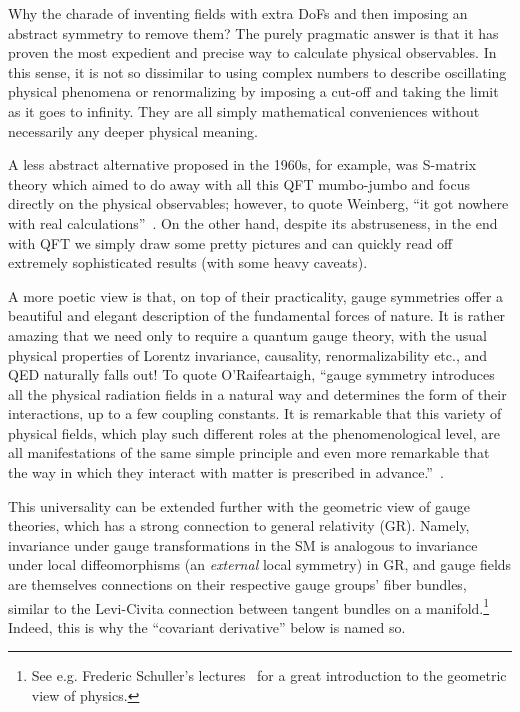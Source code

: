 Why the charade of inventing fields with extra DoFs and then imposing an abstract symmetry to remove them?
The purely pragmatic answer is that it has proven the most expedient and precise way to calculate physical observables.
In this sense, it is not so dissimilar to using complex numbers to describe oscillating physical phenomena or renormalizing by imposing a cut-off and taking the limit as it goes to infinity.
They are all simply mathematical conveniences without necessarily any deeper physical meaning.

A less abstract alternative proposed in the 1960s, for example, was S-matrix theory which aimed to do away with all this QFT mumbo-jumbo and focus directly on the physical observables; however, to quote Weinberg, ``it got nowhere with real calculations''~\cite{WeinbergCERNLecture}.
On the other hand, despite its abstruseness, in the end with QFT we simply draw some pretty pictures and can quickly read off extremely sophisticated results (with some heavy caveats).

A more poetic view is that, on top of their practicality, gauge symmetries offer a beautiful and elegant description of the fundamental forces of nature.
It is rather amazing that we need only to require a quantum \UU[1] gauge theory, with the usual physical properties of Lorentz invariance, causality, renormalizability etc., and QED naturally falls out!
To quote O'Raifeartaigh, ``gauge symmetry introduces all the physical radiation fields in a natural way and determines the form of their interactions, up to a few coupling constants. 
It is remarkable that this variety of physical fields, which play such different roles at the phenomenological level, are all manifestations of the same simple principle and even more remarkable that the way in which they interact with matter is prescribed in advance.''~\cite{ORaifeartaigh:1997dvq}.

This universality can be extended further with the geometric view of gauge theories, which has a strong connection to general relativity (GR).
Namely, invariance under gauge transformations in the SM is analogous to invariance under local diffeomorphisms (an \textit{external} local symmetry) in GR, and gauge fields are themselves connections on their respective gauge groups' fiber bundles, similar to the Levi-Civita connection between tangent bundles on a manifold.\footnote{See e.g. Frederic Schuller's lectures~\cite{SchullerGATP} for a great introduction to the geometric view of physics.}
Indeed, this is why the ``covariant derivative'' below is named so.

